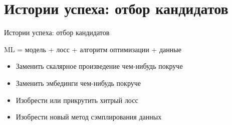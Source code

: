 \documentclass[11pt,aspectratio=169]{beamer}
\begin{document}
\section{Истории успеха: отбор кандидатов}

\begin{frame}{Истории успеха: отбор кандидатов}

ML = модель + лосс + алгоритм оптимизации + данные

\vfill

\begin{tcolorbox}[colback=info!5,colframe=info!80,title=Как оставить след в науке]
\pause
\begin{itemize}[<+->]
\item Заменить скалярное произведение чем-нибудь покруче
\item Заменить эмбединги чем-нибудь покруче
\item Изобрести или прикрутить хитрый лосс
\item Изобрести новый метод сэмплирования данных
\end{itemize}
\end{tcolorbox}

\end{frame}
\end{document}
